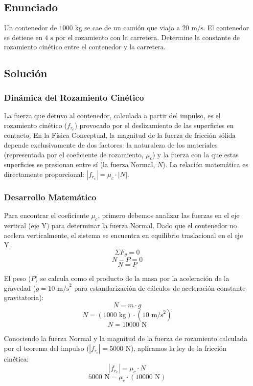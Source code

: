 \documentclass{article}
\begin{document}
\newpage

\subsection*{Enunciado}
Un contenedor de $1000 \text{ kg}$ se cae de un camión que viaja a $20 \text{ m/s}$. El contenedor se detiene en $4 \text{ s}$ por el rozamiento con la carretera. Determine la constante de rozamiento cinético entre el contenedor y la carretera.

\subsection*{Solución}

\subsubsection*{Dinámica del Rozamiento Cinético}
La fuerza que detuvo al contenedor, calculada a partir del impulso, es el rozamiento cinético ($f_{r_c}$) provocado por el deslizamiento de las superficies en contacto. En la Física Conceptual, la magnitud de la fuerza de fricción sólida depende exclusivamente de dos factores: la naturaleza de los materiales (representada por el coeficiente de rozamiento, $\mu_c$) y la fuerza con la que estas superficies se presionan entre sí (la fuerza Normal, $N$). La relación matemática es directamente proporcional: $|f_{r_c}| = \mu_c \cdot |N|$.

\subsubsection*{Desarrollo Matemático}
Para encontrar el coeficiente $\mu_c$, primero debemos analizar las fuerzas en el eje vertical (eje Y) para determinar la fuerza Normal. Dado que el contenedor no acelera verticalmente, el sistema se encuentra en equilibrio traslacional en el eje Y.
$$\Sigma F_y = 0$$
$$N - P = 0$$
$$N = P$$

El peso ($P$) se calcula como el producto de la masa por la aceleración de la gravedad ($g = 10 \text{ m/s}^2$ para estandarización de cálculos de aceleración constante gravitatoria):
$$N = m \cdot g$$
$$N = (1000 \text{ kg}) \cdot (10 \text{ m/s}^2)$$
$$N = 10000 \text{ N}$$

Conociendo la fuerza Normal y la magnitud de la fuerza de rozamiento calculada por el teorema del impulso ($|f_{r_c}| = 5000 \text{ N}$), aplicamos la ley de la fricción cinética:
$$|f_{r_c}| = \mu_c \cdot N$$
$$5000 \text{ N} = \mu_c \cdot (10000 \text{ N})$$
\end{document}
